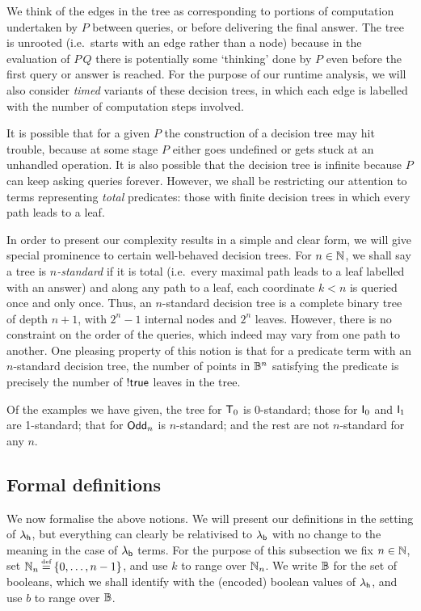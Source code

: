 \documentclass[12pt,phd,lfcs,twoside,openright,logo,leftchapter,normalheadings]{infthesis}
\theoremstyle{plain}
\theoremstyle{definition}
\begin{document}
We think of the edges in the tree as corresponding to portions of
computation undertaken by $P$ between queries, or before delivering
the final answer.  The tree is unrooted (i.e.\ starts with an edge
rather than a node) because in the evaluation of $P\,Q$ there is
potentially some `thinking' done by $P$ even before the first query or
answer is reached.  For the purpose of our runtime analysis, we will
also consider \emph{timed} variants of these decision trees, in which
each edge is labelled with the number of computation steps involved.

It is possible that for a given $P$ the construction of a decision
tree may hit trouble, because at some stage $P$ either goes undefined
or gets stuck at an unhandled operation.  It is also possible that the
decision tree is infinite because $P$ can keep asking queries forever.
However, we shall be restricting our attention to terms representing
\emph{total} predicates: those with finite decision trees in which
every path leads to a leaf.

In order to present our complexity results in a simple and clear form,
we will give special prominence to certain well-behaved decision
trees.  For $n \in \mathbb{N}$, we shall say a tree is \emph{$n$-standard} if
it is total (i.e.\ every maximal path leads to a leaf labelled with an
answer) and along any path to a leaf, each coordinate $k<n$ is queried
once and only once. Thus, an $n$-standard decision tree is a complete
binary tree of depth $n+1$, with $2^n - 1$ internal nodes and $2^n$
leaves.  However, there is no constraint on the order of the queries,
which indeed may vary from one path to another.  One pleasing property
of this notion is that for a predicate term with an $n$-standard
decision tree, the number of points in $\mathbb{B}^n$ satisfying the predicate
is precisely the number of $\mathord{!} \mathsf{true}$ leaves in the tree.

Of the examples we have given, the tree for $\mathsf{T}_0$ is 0-standard;
those for $\mathsf{I}_0$ and $\mathsf{I}_1$ are 1-standard; that for
$\mathsf{Odd}_n$ is $n$-standard; and the rest are not $n$-standard for
any $n$.

\subsection{Formal definitions}
\label{sec:predicate-models}
We now formalise the above notions.  We will present our definitions
in the setting of $\lambda_{\mathsf{h}}$, but everything can clearly be relativised
to $\lambda_{\mathsf{b}}$ with no change to the meaning in the case of $\lambda_{\mathsf{b}}$
terms.  For the purpose of this subsection we fix $n \in \mathbb{N}$, set
$\N_n \defas \{0,\ldots,n-1\}$, and use $k$ to range over $\mathbb{N}_n$. We
write $\mathbb{B}$ for the set of booleans, which we shall identify with the
(encoded) boolean values of $\lambda_{\mathsf{h}}$, and use $b$ to range over $\mathbb{B}$.
\end{document}
